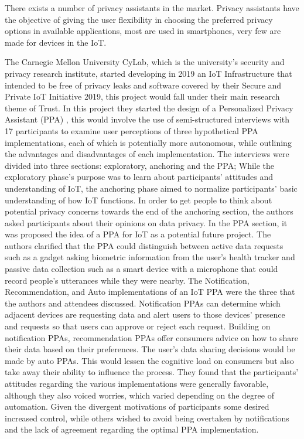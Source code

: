 \documentclass[conference]{IEEEtran}
\begin{document}
There exists a number of privacy assistants in the market. Privacy assistants
have the objective of giving the user flexibility in choosing the preferred
privacy options in available applications, most are used in smartphones,
very few are made for devices in the IoT.

The Carnegie Mellon University CyLab, which is the university's security
and privacy research institute, started developing in 2019 an IoT Infrastructure
that intended to be free of privacy leaks and software covered by their
Secure and Private IoT Initiative 2019, this project would fall under
their main research theme of Trust. In this project they started the design
of a Personalized Privacy Assistant (PPA) \cite{ColnagoInforming}, this
would involve the use of semi-structured interviews with 17 participants
to examine user perceptions of three hypothetical PPA implementations,
each of which is potentially more autonomous, while outlining the advantages
and disadvantages of each implementation. The interviews were divided into
three sections: exploratory, anchoring and the PPA; While the exploratory
phase's purpose was to learn about participants' attitudes and understanding
of IoT, the anchoring phase aimed to normalize participants' basic understanding
of how IoT functions. In order to get people to think about potential privacy
concerns towards the end of the anchoring section, the authors asked participants
about their opinions on data privacy. In the PPA section, it was proposed
the idea of a PPA for IoT as a potential future project. The authors clarified
that the PPA could distinguish between active data requests such as a gadget
asking biometric information from the user's health tracker and passive
data collection such as a smart device with a microphone that could record
people's utterances while they were nearby. The Notification, Recommendation,
and Auto implementations of an IoT PPA were the three that the authors and
attendees discussed. Notification PPAs can determine which adjacent devices
are requesting data and alert users to those devices' presence and requests
so that users can approve or reject each request. Building on notification
PPAs, recommendation PPAs offer consumers advice on how to share their data
based on their preferences. The user's data sharing decisions would be made
by auto PPAs. This would lessen the cognitive load on consumers but also
take away their ability to influence the process. They found that the participants'
attitudes regarding the various implementations were generally favorable,
although they also voiced worries, which varied depending on the degree
of automation. Given the divergent motivations of participants some desired
increased control, while others wished to avoid being overtaken by notifications
and the lack of agreement regarding the optimal PPA implementation.
\end{document}
